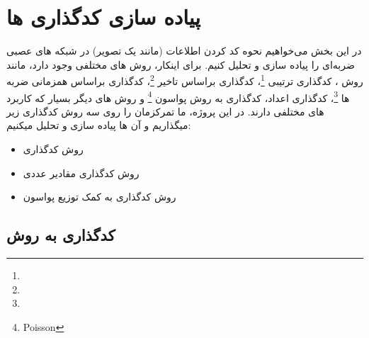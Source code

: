 
\newpage
\section{پیاده سازی کدگذاری ها}
    در این بخش می‌خواهیم نحوه کد کردن اطلاعات
    (مانند یک تصویر) 
    در شبکه های عصبی ضربه‌ای را پیاده سازی و تحلیل کنیم. برای اینکار، روش های مختلفی وجود دارد، مانند روش 
    ، 
    کدگذاری ترتیبی
    \footnote{}، 
    کدگذاری براساس تاخیر
    \footnote{}، 
    کدگذاری براساس همزمانی ضربه ها
    \footnote{}، 
    کدگذاری اعداد، کدگذاری به روش پواسون
    \footnote{Poisson} 
    و روش های دیگر بسیار که کاربرد های مختلفی دارند. 
    در این پروژه، ما تمرکزمان را روی سه روش کدگذاری زیر میگذاریم و آن ها پیاده سازی و تحلیل میکنیم:
    \begin{itemize}
        \item روش کدگذاری 
        \item روش کدگذاری مقادیر عددی
        \item روش کدگذاری به کمک توزیع پواسون
    \end{itemize}

    \subsection*{کدگذاری به روش 
    }
        